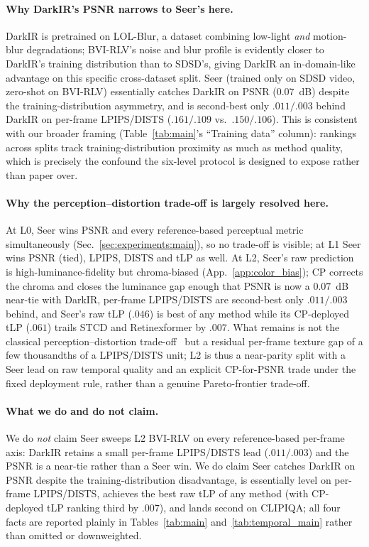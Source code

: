 \paragraph{Why DarkIR's PSNR narrows to Seer's here.} DarkIR is pretrained on LOL-Blur, a dataset combining low-light \emph{and} motion-blur degradations; BVI-RLV's noise and blur profile is evidently closer to DarkIR's training distribution than to SDSD's, giving DarkIR an in-domain-like advantage on this specific cross-dataset split. Seer (trained only on SDSD video, zero-shot on BVI-RLV) essentially catches DarkIR on PSNR ($0.07$~dB) despite the training-distribution asymmetry, and is second-best only $.011/.003$ behind DarkIR on per-frame LPIPS/DISTS ($.161/.109$ vs.\ $.150/.106$). This is consistent with our broader framing (Table~\ref{tab:main}'s ``Training data'' column): rankings across splits track training-distribution proximity as much as method quality, which is precisely the confound the six-level protocol is designed to expose rather than paper over.

\paragraph{Why the perception--distortion trade-off is largely resolved here.} At L0, Seer wins PSNR and every reference-based perceptual metric simultaneously (Sec.~\ref{sec:experiments:main}), so no trade-off is visible; at L1 Seer wins PSNR (tied), LPIPS, DISTS and tLP as well. At L2, Seer's raw prediction is high-luminance-fidelity but chroma-biased (App.~\ref{app:color_bias}); CP corrects the chroma and closes the luminance gap enough that PSNR is now a $0.07$~dB near-tie with DarkIR, per-frame LPIPS/DISTS are second-best only $.011/.003$ behind, and Seer's raw tLP ($.046$) is best of any method while its CP-deployed tLP ($.061$) trails STCD and Retinexformer by $.007$. What remains is not the classical perception--distortion trade-off~\citep{blau_michaeli} but a residual per-frame texture gap of a few thousandths of a LPIPS/DISTS unit; L2 is thus a near-parity split with a Seer lead on raw temporal quality and an explicit CP-for-PSNR trade under the fixed deployment rule, rather than a genuine Pareto-frontier trade-off.

\paragraph{What we do and do not claim.} We do \emph{not} claim Seer sweeps L2 BVI-RLV on every reference-based per-frame axis: DarkIR retains a small per-frame LPIPS/DISTS lead ($.011/.003$) and the PSNR is a near-tie rather than a Seer win. We do claim Seer catches DarkIR on PSNR despite the training-distribution disadvantage, is essentially level on per-frame LPIPS/DISTS, achieves the best raw tLP of any method (with CP-deployed tLP ranking third by $.007$), and lands second on CLIPIQA; all four facts are reported plainly in Tables~\ref{tab:main} and~\ref{tab:temporal_main} rather than omitted or downweighted.


